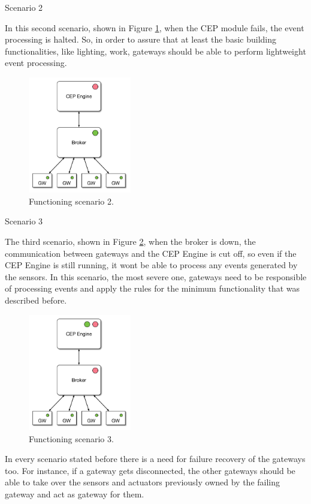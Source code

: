 \begin{Paragraph}{Scenario 2}
	
	In this second scenario, shown in Figure \ref{fig:sc2}, when the CEP module fails, the event processing is halted. So, in order to assure that at least the basic building functionalities, like lighting, work, gateways should be able to perform lightweight event processing.
	
	\begin{figure}[H]
		\centering
		\includegraphics[width=0.4\textwidth]{figures/sc2.png}
		\caption{Functioning scenario 2.}
		\label{fig:sc2}
	\end{figure}
	
\end{Paragraph}

\begin{Paragraph}{Scenario 3}
	
	The third scenario, shown in Figure \ref{fig:sc3}, when the broker is down, the communication between gateways and the CEP Engine is cut off, so even if the CEP Engine is still running, it wont be able to process any events generated by the sensors.
	In this scenario, the most severe one, gateways need to be responsible of processing events and apply the rules for the minimum functionality that was described before.
	
	\begin{figure}[H]
		\centering
		\includegraphics[width=0.4\textwidth]{figures/sc3.png}
		\caption{Functioning scenario 3. }
		\label{fig:sc3}
	\end{figure}
	
	
\end{Paragraph}

In every scenario stated before there is a need for failure recovery of the gateways too. For instance, if a gateway gets disconnected, the other gateways should be able to take over the sensors and actuators previously owned by the failing gateway and act as gateway for them.












